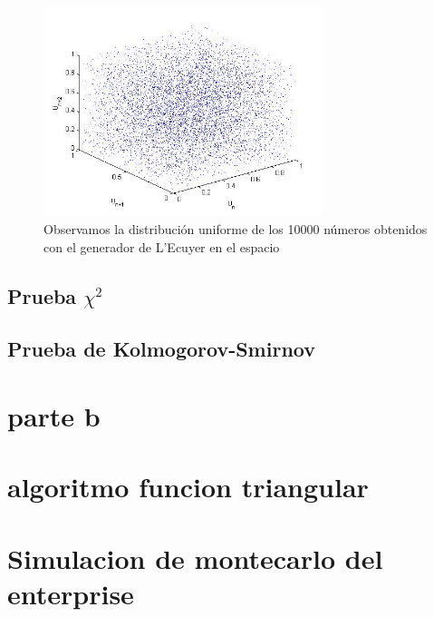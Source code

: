 \documentclass[10pt,journal,compsoc]{IEEEtran}
\begin{document}
\begin{figure}[t]
\label{fig:3d}
\begin{center}
\centering
\includegraphics[width=3.2in]{3d.jpg}
\caption{Observamos la distribuci\'on uniforme de los 10000 n\'umeros obtenidos con el generador de L'Ecuyer en el espacio}
\end{center}
\end{figure}

\subsection{Prueba $\chi^2$}


\subsection{Prueba de Kolmogorov-Smirnov}


\section{parte b}

\section{algoritmo funcion triangular}

\section{Simulacion de montecarlo del enterprise}



%
\end{document}
